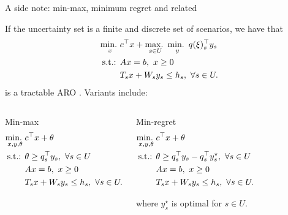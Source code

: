\begin{frame}{A side note: min-max, minimum regret and related}

If the uncertainty set is a finite and discrete set of \alert{scenarios}, we have that 
%
\begin{align*}
	\mathop{\text{min.} \ }_x & c^\top x + \mathop{\text{max.} \ }_{s \in U} \mathop{\text{min.} \ }_{y}q(\xi)_s^\top y_s \\
	\text{s.t.: } & Ax = b, \ x \ge 0 \\
	& T_sx + W_s y_s \le h_s, \ \forall s \in U.
\end{align*}
%
is a \alert{tractable} ARO \cite{mulvey1995robust}. \pause Variants include:

\vspace{-12pt}
\begin{columns}
	\begin{block}{Min-max}
	\vspace{-18pt} 
		\begin{align*}
			\mathop{\text{min.} \ }_{x,y,\theta} & c^\top x + \theta \\
			\text{s.t.: } & \theta \ge q_s^\top y_s, \ \forall s \in U \\
			& Ax = b, \ x \ge 0 \\
			& T_s x + W_s y_s \le h_s, \ \forall s \in U.
		\end{align*}
	\end{block}	
		\begin{block}{Min-regret}
	\vspace{-18pt} 
		\begin{align*}
			\mathop{\text{min.} \ }_{x,y,\theta} & c^\top x + \theta \\
			\text{s.t.: } & \theta \ge q_s^\top y_s - q_s^\top y^\star_s, \ \forall s \in U \\
			& Ax = b, \ x \ge 0 \\
			& T_sx + W_s y_s \le h_s, \ \forall s \in U.
		\end{align*}
		
		\vspace{-6pt}
		where $y^\star_s$ is optimal for $s \in U$.
	\end{block}	
\end{columns}
	
\end{frame}


